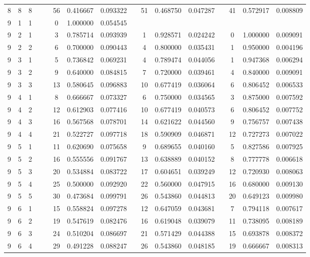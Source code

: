 \begin{appendix}
\begin{longtable}[h]{rrrccccccccccccc}
8	&	8	&	8	&&&	56	&	0.416667	&	0.093322	&&	51	&	0.468750	&	0.047287	&&	41	&	0.572917	&	0.008809	\\
9	&	1	&	1	&&&	0	&	1.000000	&	0.054545	&&		&		&		&&		&		&		\\
9	&	2	&	1	&&&	3	&	0.785714	&	0.093939	&&	1	&	0.928571	&	0.024242	&&	0	&	1.000000	&	0.009091	\\
9	&	2	&	2	&&&	6	&	0.700000	&	0.090443	&&	4	&	0.800000	&	0.035431	&&	1	&	0.950000	&	0.004196	\\
9	&	3	&	1	&&&	5	&	0.736842	&	0.069231	&&	4	&	0.789474	&	0.044056	&&	1	&	0.947368	&	0.006294	\\
9	&	3	&	2	&&&	9	&	0.640000	&	0.084815	&&	7	&	0.720000	&	0.039461	&&	4	&	0.840000	&	0.009091	\\
9	&	3	&	3	&&&	13	&	0.580645	&	0.096883	&&	10	&	0.677419	&	0.036064	&&	6	&	0.806452	&	0.006533	\\
9	&	4	&	1	&&&	8	&	0.666667	&	0.073327	&&	6	&	0.750000	&	0.034565	&&	3	&	0.875000	&	0.007592	\\
9	&	4	&	2	&&&	12	&	0.612903	&	0.077416	&&	10	&	0.677419	&	0.040573	&&	6	&	0.806452	&	0.007752	\\
9	&	4	&	3	&&&	16	&	0.567568	&	0.078701	&&	14	&	0.621622	&	0.044560	&&	9	&	0.756757	&	0.007438	\\
9	&	4	&	4	&&&	21	&	0.522727	&	0.097718	&&	18	&	0.590909	&	0.046871	&&	12	&	0.727273	&	0.007022	\\
9	&	5	&	1	&&&	11	&	0.620690	&	0.075658	&&	9	&	0.689655	&	0.040160	&&	5	&	0.827586	&	0.007925	\\
9	&	5	&	2	&&&	16	&	0.555556	&	0.091767	&&	13	&	0.638889	&	0.040152	&&	8	&	0.777778	&	0.006618	\\
9	&	5	&	3	&&&	20	&	0.534884	&	0.083722	&&	17	&	0.604651	&	0.039249	&&	12	&	0.720930	&	0.008063	\\
9	&	5	&	4	&&&	25	&	0.500000	&	0.092920	&&	22	&	0.560000	&	0.047915	&&	16	&	0.680000	&	0.009130	\\
9	&	5	&	5	&&&	30	&	0.473684	&	0.099791	&&	26	&	0.543860	&	0.044813	&&	20	&	0.649123	&	0.009980	\\
9	&	6	&	1	&&&	15	&	0.558824	&	0.097278	&&	12	&	0.647059	&	0.043681	&&	7	&	0.794118	&	0.007617	\\
9	&	6	&	2	&&&	19	&	0.547619	&	0.082476	&&	16	&	0.619048	&	0.039079	&&	11	&	0.738095	&	0.008189	\\
9	&	6	&	3	&&&	24	&	0.510204	&	0.086697	&&	21	&	0.571429	&	0.044388	&&	15	&	0.693878	&	0.008372	\\
9	&	6	&	4	&&&	29	&	0.491228	&	0.088247	&&	26	&	0.543860	&	0.048185	&&	19	&	0.666667	&	0.008313	\\

\end{longtable}
\end{appendix}
